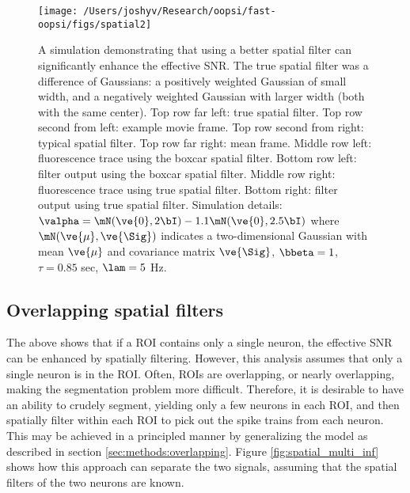 \begin{figure}[h!]
\centering \texttt{[image: /Users/joshyv/Research/oopsi/fast-oopsi/figs/spatial2]}
\caption[spatial filtering can improve effective SNR]{A simulation demonstrating that using a better spatial filter can significantly enhance the effective SNR. The true spatial filter was a difference of Gaussians: a positively weighted Gaussian of small width, and a negatively weighted Gaussian with larger width (both with the same center).  Top row far left: true spatial filter.  Top row second from left: example movie frame. Top row second from right: typical spatial filter.   Top row far right: mean frame.  Middle row left: fluorescence trace using the boxcar spatial filter. Bottom row left: \foopsi filter output using the boxcar spatial filter.  Middle row right: fluorescence trace using true spatial filter.  Bottom right: \foopsi filter output using true spatial filter. Simulation details: $\valpha=\mN(\ve{0},2 \bI)-1.1 \mN(\ve{0},2.5 \bI)$ where $\mN(\ve{\mu},\ve{\Sig})$ indicates a two-dimensional Gaussian with mean $\ve{\mu}$ and covariance matrix $\ve{\Sig}$, $\bbeta=1$, $\tau=0.85$ sec, $\lam=5$ Hz.} \label{fig:spatial} 
\end{figure}



\subsection{Overlapping spatial filters} \label{sec:results:overlapping}


The above shows that if a ROI contains only a single neuron, the effective SNR can be enhanced by spatially filtering.  However, this analysis assumes that only a single neuron is in the ROI.  Often, ROIs are overlapping, or nearly overlapping, making the segmentation problem more difficult.  Therefore, it is desirable to have an ability to crudely segment, yielding only a few neurons in each ROI, and then spatially filter within each ROI to pick out the spike trains from each neuron.  This may be achieved in a principled manner by generalizing the model as described in section \ref{sec:methods:overlapping}.  Figure \ref{fig:spatial_multi_inf} shows how this approach can separate the two signals, assuming that the spatial filters of the two neurons are known.  %

